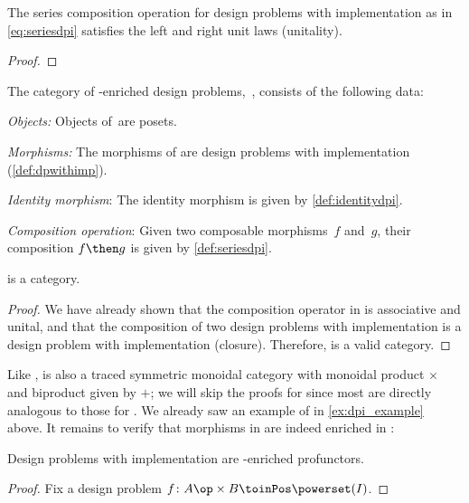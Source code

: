 \begin{lemma}
  The series composition operation for design problems with implementation as in \cref{eq:seriesdpi} satisfies the left and right unit laws (unitality).
\end{lemma}

\begin{proof}
\end{proof}


\begin{definition}
  The category of \Set-enriched design problems,~\DPI, consists of the following data:
  \begin{compactenum}
    \item \emph{Objects:}  Objects of~\DPI are posets.
    \item \emph{Morphisms:} The morphisms of \DPI are design problems with implementation (\cref{def:dpwithimp}).
    \item \emph{Identity morphism}: The identity morphism is given by \cref{def:identitydpi}.
    \item \emph{Composition operation}: Given two composable morphisms~$f$ and~$g$, their composition $f\then g$ is given by \cref{def:seriesdpi}.
  \end{compactenum}
\end{definition}

\begin{lemma}
  \DPI is a category.
\end{lemma}

\begin{proof}
  We have already shown that the composition operator in \DPI is associative and unital, and that the composition of two design problems with implementation is a design problem with implementation (closure). Therefore, \DPI is a valid category.
\end{proof}

Like \DP, \DPI is also a traced symmetric monoidal category with monoidal product $\times$ and biproduct given by $+$; we will skip the proofs for \DPI since most are directly analogous to those for \DP. We already saw an example of \DPI in \cref{ex:dpi_example} above. It remains to verify that morphisms in \DPI are indeed enriched in \Set:

\begin{proposition}
  Design problems with implementation are \Set-enriched profunctors.
\end{proposition}
\begin{proof}
  Fix a design problem $f \colon A\op \times B \toinPos \powerset(I)$.
\end{proof}

